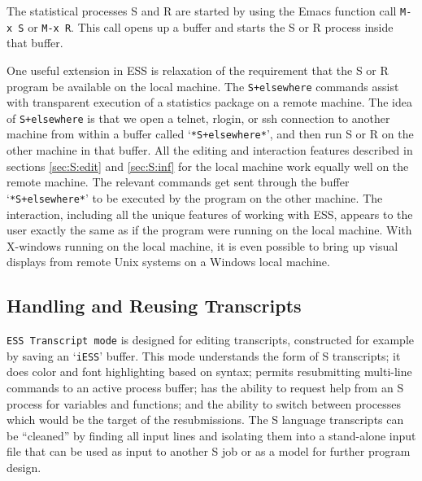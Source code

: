 \documentclass{article}
\newcommand{\stexttt}[1]{{\small\texttt{#1}}}
\newcommand{\file}[1]{`\stexttt{#1}'}
\begin{document}
The statistical processes S and R are started by using the Emacs function call
\stexttt{M-x~S} or \stexttt{M-x~R}.  This call opens up a buffer and starts the
S or R process inside that buffer.

One useful extension in ESS is relaxation of the requirement that the
S or R program be available on the local machine.  The
\stexttt{S+elsewhere} commands assist with
transparent execution of a statistics package on a remote machine.
The idea of \stexttt{S+elsewhere} is that we open a telnet, rlogin, or
ssh connection to another machine from within a buffer called
\file{*S+elsewhere*}, and then run S or R on the other machine in
that buffer.  All the editing and interaction features described in sections
\ref{sec:S:edit} and \ref{sec:S:inf} for the local machine
work equally well on the remote machine.  The relevant commands
get sent through the buffer
\file{*S+elsewhere*} to be executed by the program on the other
machine.  The interaction, including all the unique
features of working with ESS, appears to the user exactly the same as if the
program were running on the local machine.  With X-windows running on the
local machine, it is even possible to
bring up visual displays from remote Unix systems on a Windows local machine.

\subsection{Handling and Reusing Transcripts}
\label{sec:S:trans}

\stexttt{ESS Transcript mode} is designed
for editing transcripts, constructed for example by saving
an \file{iESS} buffer.  This mode understands the form of S
transcripts; it does color and font highlighting based on syntax; permits 
resubmitting
multi-line commands to an active process buffer; has the ability to
request help from an S process for variables and functions; and the ability to
switch between processes which would be the target of the resubmissions.
The S language transcripts can be ``cleaned'' by
finding all input lines and isolating them into a stand-alone input file
that can be used as input to another S job or as a model for further
program design.
\end{document}
